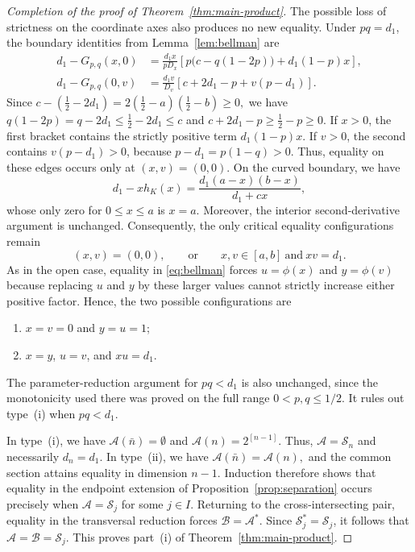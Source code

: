 \documentclass[11pt]{article}
\numberwithin{equation}{section}
\theoremstyle{definition}
\theoremstyle{remark}
\begin{document}
\begin{proof}[Completion of the proof of Theorem~\ref{thm:main-product}]
The possible loss of strictness on the coordinate axes also produces
no new equality.  Under $pq=d_1$, the boundary identities from
Lemma~\ref{lem:bellman} are
\begin{align*}
 d_1-G_{p,q}(x,0)
 &=
 \frac{d_1x}{pD_x}
 \left[
  p\bigl(c-q(1-2p)\bigr)+d_1(1-p)x
 \right],\\
 d_1-G_{p,q}(0,v)
 &=
 \frac{d_1v}{D_v}
 \left[
  c+2d_1-p+v(p-d_1)
 \right].
\end{align*}
Since
$
 c-\left(\frac12-2d_1\right)
 =
 2\left(\frac12-a\right)
  \left(\frac12-b\right)\geq0,
$
we have
$
 q(1-2p)
 =
 q-2d_1
 \leq\frac12-2d_1
 \leq c
$
and
$
 c+2d_1-p
 \geq\frac12-p
 \geq0.
$
If $x>0$, the first bracket contains the strictly positive term
$d_1(1-p)x$.  If $v>0$, the second contains
$v(p-d_1)>0$, because $p-d_1=p(1-q)>0$.  Thus, equality on these
edges occurs only at $(x,v)=(0,0)$. 
On the curved boundary, we have
\begin{equation*}
 d_1-xh_K(x)
 =
 \frac{d_1(a-x)(b-x)}{d_1+cx},
\end{equation*}
whose only zero for $0\leq x\leq a$ is $x=a$.
 Moreover, the interior second-derivative argument is unchanged.  Consequently, the only
critical equality configurations remain
\begin{equation*}
 (x,v)=(0,0),
 \qquad\text{or}\qquad
 x,v\in[a,b]\ \text{and}\ xv=d_1.
\end{equation*}
As in the open case, equality in \eqref{eq:bellman} forces
$
 u=\phi(x)
$
and
$
 y=\phi(v)
$
because replacing $u$ and $y$ by these larger values cannot strictly
increase either positive factor.  Hence, the two possible configurations
are
\begin{enumerate}[label=\textup{(\roman*)},leftmargin=2.2em]
 \item $x=v=0$ and $y=u=1$;
 \item $x=y$, $u=v$, and $xu=d_1$.
\end{enumerate}
The parameter-reduction argument for $pq<d_1$ is also unchanged, since
the monotonicity used there was proved on the full range
$0<p,q\leq1/2$.  It rules out type~\textup{(i)} when $pq<d_1$.

In type~\textup{(i)}, we have $
 \mathcal{A}(\bar n)=\emptyset$ and $
 \mathcal{A}(n)=2^{[n-1]}$.
Thus, $\mathcal{A}=\mathcal{S}_n$ and necessarily $d_n=d_1$.  In
type~\textup{(ii)}, we have
$
 \mathcal{A}(\bar n)=\mathcal{A}(n),
$
and the common section attains equality in dimension $n-1$.
Induction therefore shows that equality in the endpoint extension of
Proposition~\ref{prop:separation} occurs precisely when
$
 \mathcal{A}=\mathcal{S}_j
$
for some $j\in I$.
Returning to the cross-intersecting pair, equality in the transversal
reduction forces $\mathcal{B}=\mathcal{A}^*$.  Since
$\mathcal{S}_j^*=\mathcal{S}_j$, it follows that
$
 \mathcal{A}=\mathcal{B}=\mathcal{S}_j.
$
This proves part~\textup{(i)} of Theorem~\ref{thm:main-product}.


\end{proof}
\end{document}
